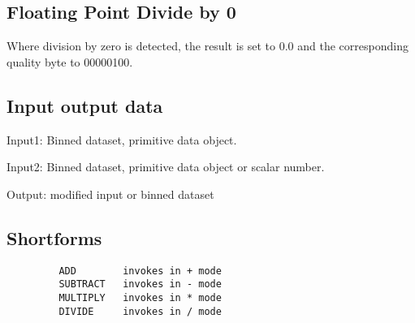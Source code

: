 \documentclass{book}
\renewcommand{\_}{{\tt\char'137}}     %
\begin{document}
\subsection{Floating Point Divide by 0}
Where division by zero is detected, the result is set to 0.0
and the corresponding quality byte to 00000100.
 
\subsection{Input output data}
Input1: Binned dataset, primitive data object.
 
Input2: Binned dataset, primitive data object
or scalar number.
 
Output: modified input or binned dataset
 
\subsection{Shortforms}
\begin{verbatim}
         ADD        invokes in + mode
         SUBTRACT   invokes in - mode
         MULTIPLY   invokes in * mode
         DIVIDE     invokes in / mode
\end{verbatim}
\end{document}
